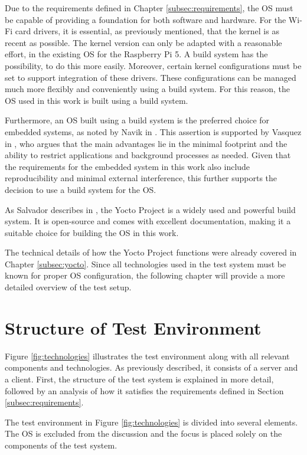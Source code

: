 Due to the requirements defined in Chapter \ref{subsec:requirements}, the \ac{OS} must be capable of providing a foundation for both software and hardware. 
For the Wi-Fi card drivers, it is essential, as previously mentioned, that the kernel is as recent as possible. 
The kernel version can only be adapted with a reasonable effort, in the existing \acl{OS} for the Raspberry Pi 5.
A build system has the possibility, to do this more easily.
Moreover, certain kernel configurations must be set to support integration of these drivers. 
These configurations can be managed much more flexibly and conveniently using a build system. 
For this reason, the \ac{OS} used in this work is built using a build system.

Furthermore, an \ac{OS} built using a build system is the preferred choice for embedded systems, as noted by Navik in \cite{8008968}. 
This assertion is supported by Vasquez in \cite[Chap. 6]{10163343}, who argues that the main advantages lie in the minimal footprint and the ability to restrict applications and background processes as needed. 
Given that the requirements for the embedded system in this work also include reproducibility and minimal external interference, this further supports the decision to use a build system for the \ac{OS}.

As Salvador describes in \cite[Chap. 1]{10251255}, the Yocto Project is a widely used and powerful build system. 
It is open-source and comes with excellent documentation, making it a suitable choice for building the \ac{OS} in this work.

The technical details of how the Yocto Project functions were already covered in Chapter \ref{subsec:yocto}. 
Since all technologies used in the test system must be known for proper \ac{OS} configuration, the following chapter will provide a more detailed overview of the test setup.

\section{Structure of Test Environment}
Figure \ref{fig:technologies} illustrates the test environment along with all relevant components and technologies. 
As previously described, it consists of a server and a client. 
First, the structure of the test system is explained in more detail, followed by an analysis of how it satisfies the requirements defined in Section \ref{subsec:requirements}.

The test environment in Figure \ref{fig:technologies} is divided into several elements. 
The \ac{OS} is excluded from the discussion and the focus is placed solely on the components of the test system.

